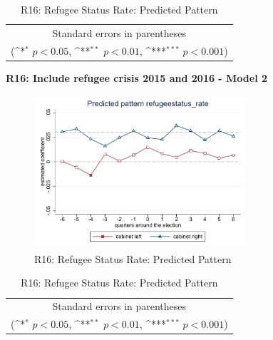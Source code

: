 \documentclass[10pt,a4paper]{scrartcl}
\begin{document}
\begin{table}[!ht]\centering
	\renewcommand{\arraystretch}{1.25}
	\def\sym#1{\ifmmode^{#1}\else\(^{#1}\)\fi}
	\caption{R16: Refugee Status Rate: Predicted Pattern}
	\begin{tabular}{l*{2}{c}}
		\hline\hline
		
		\hline\hline
		\multicolumn{3}{c}{\footnotesize Standard errors in parentheses} \\
		\multicolumn{3}{c}{\footnotesize (\sym{*} \(p<0.05\), \sym{**} \(p<0.01\), \sym{***} \(p<0.001\))}\\
	\end{tabular}
\end{table}

\clearpage
\textbf{R16: Include refugee crisis 2015 and 2016 - Model 2}
\begin{figure}[!ht]
	\centering
	\includegraphics[width=0.7\textwidth]{figures_edited/refugeestatus_rate_graph2_R16.pdf}
	\caption{R16: Refugee Status Rate: Predicted Pattern}
\end{figure}

\begin{table}[!ht]\centering
	\footnotesize
	\renewcommand{\arraystretch}{1.2}
	\def\sym#1{\ifmmode^{#1}\else\(^{#1}\)\fi}
	\caption{R16: Refugee Status Rate: Predicted Pattern}
	\begin{tabular}{l*{2}{c}}
		\hline\hline
		
		\hline\hline
		\multicolumn{3}{c}{\footnotesize Standard errors in parentheses} \\
		\multicolumn{3}{c}{\footnotesize (\sym{*} \(p<0.05\), \sym{**} \(p<0.01\), \sym{***} \(p<0.001\))} \\
	\end{tabular}
\end{table}
\end{document}

